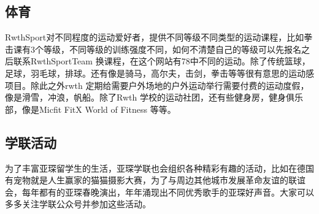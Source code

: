   \subsection{体育}

    RwthSport对不同程度的运动爱好者，提供不同等级不同类型的运动课程，比如拳击课有3个等级，不同等级的训练强度不同，如何不清楚自己的等级可以先报名之后联系RwthSportTeam 换课程，在这个网站有78中不同的运动。除了传统篮球，足球，羽毛球，排球。还有像是骑马，高尔夫，击剑，拳击等等很有意思的运动感项目。除此之外rwth 定期给需要户外场地的户外运动举行需要付费的运动度假，像是滑雪，冲浪，帆船。除了Rwth 学校的运动社团，还有些健身房，健身俱乐部，像是Micfit FitX World of Fitness 等等。

  \subsection{学联活动}

    为了丰富亚琛留学生的生活，亚琛学联也会组织各种精彩有趣的活动，比如在德国有宠物就是人生赢家的猫猫摄影大赛，为了与周边其他城市发展革命友谊的联谊会，每年都有的亚琛春晚演出，年年涌现出不同优秀歌手的亚琛好声音。大家可以多多关注学联公众号并参加这些活动。
